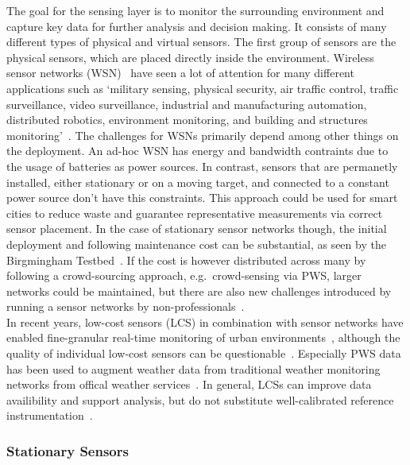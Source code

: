 The goal for the sensing layer is to monitor the surrounding environment and capture key data for further analysis and decision making. It consists of many different types of physical and virtual sensors. The first group of sensors are the physical sensors, which are placed directly inside the environment. Wireless sensor networks (WSN)~\cite{dargie2010fundamentals} have seen a lot of attention for many different applications such as `military sensing, physical security, air traffic control, traffic surveillance, video surveillance, industrial and manufacturing automation, distributed robotics, environment monitoring, and building and structures monitoring'~\cite{chong2003sensor}. The challenges for WSNs primarily depend among other things on the deployment. An ad-hoc WSN has energy and bandwidth contraints due to the usage of batteries as power sources.
In contrast, sensors that are permanetly installed, either stationary or on a moving target, and connected to a constant power source don't have this constraints. This approach could be used for smart cities to reduce waste and guarantee representative measurements via correct sensor placement. In the case of stationary sensor networks though, the initial deployment and following maintenance cost can be substantial, as seen by the Birgmingham Testbed~\cite{chapman2015birmingham}. If the cost is however distributed across many by following a crowd-sourcing approach, e.g.\ crowd-sensing via PWS, larger networks could be maintained, but there are also new challenges introduced by running a sensor networks by non-professionals~\cite{meier2017crowdsourcing}.\\
In recent years, low-cost sensors (LCS) in combination with sensor networks have enabled fine-granular real-time monitoring of urban environments~\cite{grimmond2006progress, rundel2009environmental}, although the quality of individual low-cost sensors can be questionable~\cite{castell2017can}. Especially PWS data has been used to augment weather data from traditional weather monitoring networks from offical weather services~\cite{hahn2022observations}. In general, LCSs can improve data availibility and support analysis, but do not substitute well-calibrated reference instrumentation~\cite{lewis2018low}.

\subsubsection{Stationary Sensors}

